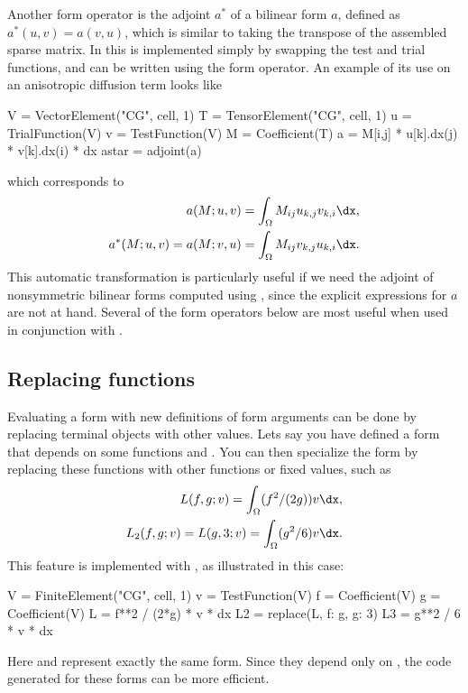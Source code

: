 Another form operator is the adjoint $a^*$ of a bilinear form $a$,
defined as $a^*(u,v) = a(v,u)$, which is similar to taking the
transpose of the assembled sparse matrix.  In \ufl{} this is
implemented simply by swapping the test and trial functions,
and can be written using the  form operator.
An example of its use on an anisotropic diffusion term looks like
\begin{python}
V = VectorElement("CG", cell, 1)
T = TensorElement("CG", cell, 1)
u = TrialFunction(V)
v = TestFunction(V)
M = Coefficient(T)
a = M[i,j] * u[k].dx(j) * v[k].dx(i) * dx
astar = adjoint(a)
\end{python}
which corresponds to
\begin{align}
a(M; u, v) = \int_\Omega M_{ij} u_{k,j} v_{k,i} \dx, \\
a^*(M; u, v) = a(M; v, u) = \int_\Omega  M_{ij} v_{k,j} u_{k,i} \dx.
\end{align}
This automatic transformation is particularly useful if we need the
adjoint of nonsymmetric bilinear forms computed using
, since the explicit expressions for $a$ are not at
hand.  Several of the form operators below are most useful when used
in conjunction with .

\subsection{Replacing functions}
\label{ufl:sec:replace}

Evaluating a form with new definitions of form arguments can be done
by replacing terminal objects with other values.  Lets say you have
defined a form  that depends on some functions  and
.  You can then specialize the form by replacing these
functions with other functions or fixed values, such as
\begin{align}
L(f, g; v) = \int_\Omega (f^2 / (2g)) v \dx, \\
L_2(f, g; v) = L(g, 3; v) = \int_\Omega (g^2 / 6) v \dx.
\end{align}
This feature is implemented with , as illustrated in this case:
\begin{python}
V = FiniteElement("CG", cell, 1)
v = TestFunction(V)
f = Coefficient(V)
g = Coefficient(V)
L = f**2 / (2*g) * v * dx
L2 = replace(L, { f: g, g: 3})
L3 = g**2 / 6 * v * dx
\end{python}
Here  and  represent exactly the same form. Since
they depend only on , the code generated for these forms can
be more efficient.

